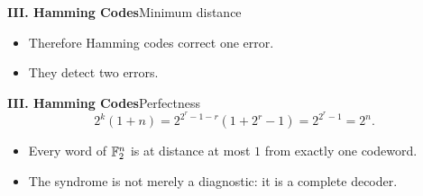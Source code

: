 \begin{frame}{\textbf{III. Hamming Codes}}{Minimum distance}
\small
{}
\begin{itemize}
  \item Therefore Hamming codes correct one error.
  \item They detect two errors.
\end{itemize}
\end{frame}

\begin{frame}{\textbf{III. Hamming Codes}}{Perfectness}
\small
{}
\[
  2^k(1+n)=2^{2^r-1-r}(1+2^r-1)=2^{2^r-1}=2^n.
\]
\begin{itemize}
  \item Every word of $\mathbb{F}_2^n$ is at distance at most $1$ from exactly one codeword.
  \item The syndrome is not merely a diagnostic: it is a complete decoder.
\end{itemize}
\end{frame}

